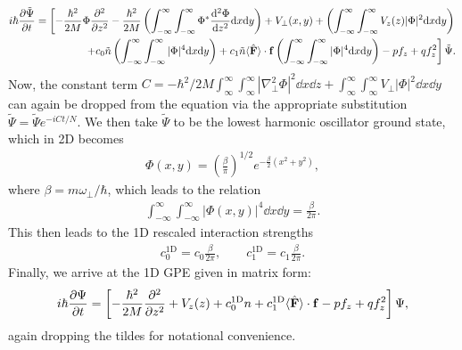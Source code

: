 \begin{equation}
\begin{split}
    i\hbar\pdv{\tilde{\Psi}}{t} = \left[
        -\frac{\hbar^2}{2M}\Phi\pdv[2]{}{z}
        - \frac{\hbar^2}{2M}\left(\int_{-\infty}^{\infty}\int_{-\infty}^{\infty}
        \Phi^*\dv[2]{\Phi}{z} \dd x \dd y\right)
        + V_\perp(x, y) + \left(\int_{-\infty}^{\infty}\int_{-\infty}^{\infty}
        V_z(z)|\Phi|^2 \dd x \dd y\right)\right. \\
        \left.+c_0\tilde{n}\left(\int_{-\infty}^{\infty}\int_{-\infty}^{\infty}
        |\Phi|^4 \dd x \dd y\right)
        +c_1\tilde{n}\langle\hat{\vb{F}}\rangle \cdot \vb{f}
        \left(\int_{-\infty}^{\infty}\int_{-\infty}^{\infty}|\Phi|^4
        \dd x \dd y\right) - pf_z + qf_z^2 \right]\tilde{\Psi}.
\end{split}
\end{equation}
Now, the constant term \(C = -\hbar^2/2M\int_{\infty}^{\infty}
\int_{\infty}^{\infty}|\nabla_\perp^2\Phi|^2\dd x \dd z
+\int_{\infty}^{\infty}\int_{\infty}^{\infty}V_\perp|\Phi|^2\dd x \dd y\) can
again be dropped from the equation via the appropriate substitution
\(\tilde{\Psi} = \tilde{\Psi}e^{-iCt/N}\).
We then take \(\tilde{\Psi}\) to be the lowest harmonic oscillator ground state,
which in 2D becomes
\begin{align}
    \Phi(x, y) = {\left(\frac{\beta}{\pi}\right)}^{1/2}
    e^{-\frac{\beta}{2}(x^2+y^2)},
\end{align}
where \(\beta=m\omega_\perp / \hbar \), which leads to the relation
\begin{align}
    \int_{-\infty}^{\infty}\int_{-\infty}^{\infty} |\Phi(x, y)|^4 \dd x \dd y
    = \frac{\beta}{2\pi}.
\end{align}
This then leads to the 1D rescaled interaction strengths
\begin{align}
    c_0^\text{1D} = c_0\frac{\beta}{2\pi}, \qquad
    c_1^\text{1D}=c_1\frac{\beta}{2\pi}.
\end{align}
Finally, we arrive at the 1D GPE given in matrix form:
\begin{align}
    i\hbar\pdv{\Psi}{t} = \left[-\frac{\hbar^2}{2M}
    \pdv[2]{}{z}+V_z(z) + c_0^\text{1D}n
    + c_1^\text{1D}\langle\hat{\vb{F}}\rangle \cdot \vb{f}
    - pf_z + qf_z^2\right]\Psi,
\end{align}
again dropping the tildes for notational convenience.

